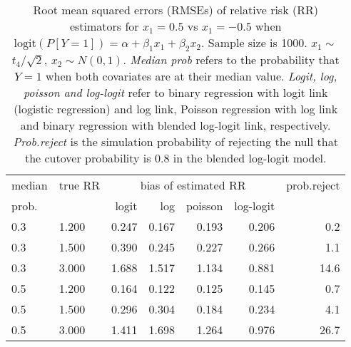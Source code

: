 \documentclass[12pt,a4paper]{article}
\begin{document}
\begin{table}[H] 
\small\sf\centering 
\caption{Root mean squared errors (RMSEs) of relative risk (RR) estimators for $x_1=0.5$ vs $x_1=-0.5$ when $\mbox{logit}(P[Y=1])=\alpha+\beta_1 x_1 + \beta_2 x_2$. Sample size is 1000. $x_1 \sim $$t_4/\sqrt{2}$, $x_2 \sim N(0,1)$. {\it Median prob} refers to the probability that $Y=1$ when both covariates are at their median value. {\it Logit, log, poisson and log-logit} refer to binary regression with logit link (logistic regression) and log link, Poisson regression with log link and binary regression with blended log-logit link, respectively. {\it Prob.reject} is the simulation probability of rejecting the null that the cutover probability is $0.8$ in the blended log-logit model.} 
\begin{tabular}{llrrrrr} 
\toprule 
median & true RR & \multicolumn{4}{c}{bias of estimated RR} & prob.reject \\ 
prob. & & logit & log & poisson & log-logit  & \\ \midrule 
0.3 & 1.200 & 0.247 & 0.167 & 0.193 & 0.206 &  0.2 \\  
0.3 & 1.500 & 0.390 & 0.245 & 0.227 & 0.266 &  1.1 \\  
0.3 & 3.000 & 1.688 & 1.517 & 1.134 & 0.881 & 14.6 \\  
0.5 & 1.200 & 0.164 & 0.122 & 0.125 & 0.145 &  0.7 \\  
0.5 & 1.500 & 0.296 & 0.304 & 0.184 & 0.234 &  4.1 \\  
0.5 & 3.000 & 1.411 & 1.698 & 1.264 & 0.976 & 26.7 \\  
\bottomrule 
\end{tabular} 
\end{table} 
\end{document}
